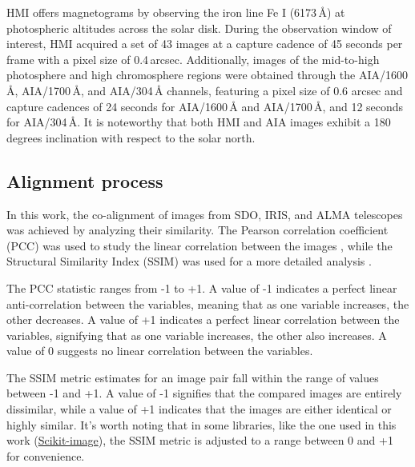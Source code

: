 \documentclass[a4paper,alpha-refs]{eSpectra}
\begin{document}
HMI offers magnetograms by observing the iron line Fe I (6173\,Å) at photospheric altitudes across the solar disk. During the observation window of interest, HMI acquired a set of 43 images at a capture cadence of 45 seconds per frame with a pixel size of 0.4\,arcsec. Additionally, images of the mid-to-high photosphere and high chromosphere regions were obtained through the AIA/1600\,Å, AIA/1700\,Å, and AIA/304\,Å channels, featuring a pixel size of 0.6 arcsec and capture cadences of 24 seconds for AIA/1600\,Å and AIA/1700\,Å, and 12 seconds for AIA/304\,Å. It is noteworthy that both HMI and AIA images exhibit a 180 degrees inclination with respect to the solar north.

\subsection{Alignment process} \label{chap_2:seccion_2.3}


In this work, the co-alignment of images from SDO, IRIS, and ALMA telescopes was achieved by analyzing their similarity. The Pearson correlation coefficient (PCC) was used to study the linear correlation between the images \cite{yeager_libguides_nodate}, while the Structural Similarity Index (SSIM) was used for a more detailed analysis \cite{wang_image_2004_SSIM}. 

The PCC statistic ranges from -1 to +1. A value of -1 indicates a perfect linear anti-correlation between the variables, meaning that as one variable increases, the other decreases. A value of +1 indicates a perfect linear correlation between the variables, signifying that as one variable increases, the other also increases. A value of 0 suggests no linear correlation between the variables.

The SSIM metric estimates for an image pair fall within the range of values between -1 and +1. A value of -1 signifies that the compared images are entirely dissimilar, while a value of +1 indicates that the images are either identical or highly similar. It's worth noting that in some libraries, like the one used in this work (\href{https://scikit-image.org/docs/stable/auto_examples/transform/plot_ssim.html}{Scikit-image}), the SSIM metric is adjusted to a range between 0 and +1 for convenience.

\end{document}
